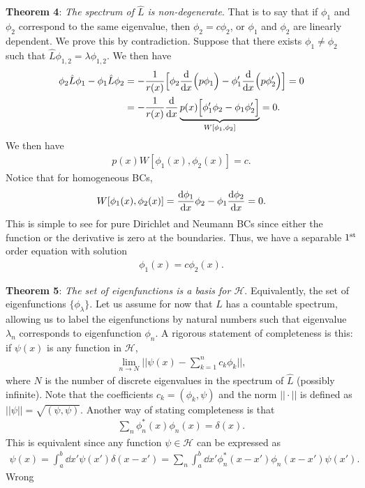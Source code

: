 \textbf{Theorem 4}: \textit{The spectrum of $\hat{L}$ is non-degenerate}.
That is to say that if $\phi_1$ and $\phi_2$ correspond to the same eigenvalue, then $\phi_2 = c \phi_2$, or $\phi_1$ and $\phi_2$ are linearly dependent.
We prove this by contradiction.
Suppose that there exists $\phi_1 \ne \phi_2$ such that $\hat{L} \phi_{1,2} = \lambda \phi_{1,2}$.
We then have
\begin{align}
    \phi_2 \hat{L} \phi_1 - \phi_1 \hat{L} \phi_2 &=  -\frac{1}{r(x)} \Big[ \phi_2 \dv{x} \Big( p \phi_1 \Big) - \phi_1' \dv{x} \Big( p \phi_2' \Big) \Big] = 0 \nonumber \\
                                                  &= -\frac{1}{r(x)} \dv{x} \underbrace{ p(x) \Big[ \phi_1' \phi_2 - \phi_1 \phi_2' \Big] }_{W[\phi_1,\phi_2]} = 0
.\end{align}
We then have 
\begin{eqnarray}
    p(x) W[\phi_1(x),\phi_2(x)] = c
.\end{eqnarray}
Notice that for homogeneous BCs,
\begin{eqnarray}
    W[\phi_1(x),\phi_2(x)] = \dv{\phi_1}{x} \phi_2 - \phi_1 \dv{\phi_2}{x} = 0
.\end{eqnarray}
This is simple to see for pure Dirichlet and Neumann BCs since either the function or the derivative is zero at the boundaries.
Thus, we have a separable $1^{\rm st}$ order equation with solution
\begin{eqnarray}
    \phi_1(x) = c\phi_2(x)
.\end{eqnarray}

\textbf{Theorem 5}: \textit{The set of eigenfunctions is a basis for $\mathcal{H}$}.
Equivalently, the set of eigenfunctions $\{ \phi_{\lambda} \} $.
Let us assume for now that $\hat{L}$ has a countable spectrum, allowing us to label the eigenfunctions by natural numbers such that eigenvalue $\lambda_{n}$ corresponds to eigenfunction $\phi_{n}$.
A rigorous statement of completeness is this: if $\psi(x)$ is any function in $\mathcal{H}$,
\begin{eqnarray}
    \lim_{n \rightarrow N} || \psi(x) - \sum_{k=1}^{n} c_{k} \phi_{k} ||
,\end{eqnarray}
where $N$ is the number of discrete eigenvalues in the spectrum of $\hat{L}$ (possibly infinite).
Note that the coefficients $c_{k} = (\phi_{k},\psi)$ and the norm $|| \cdot ||$ is defined as $|| \psi || = \sqrt{(\psi,\psi)}$.
Another way of stating completeness is that
\begin{eqnarray}
    \sum_{n} \phi_{n}^{*}(x) \phi_{n}(x) = \delta(x)
.\end{eqnarray}
This is equivalent since any function $\psi \in \mathcal{H}$ can be expressed as
\begin{eqnarray}
    \psi(x) = \int_{a}^{b} \dd{x'} \psi(x') \delta(x - x') = \sum_{n} \int_{a}^{b} \dd{x'} \phi_{n}^{*}(x - x') \phi_{n}(x - x') \psi(x')
.\end{eqnarray}
{\color{red} Wrong}







